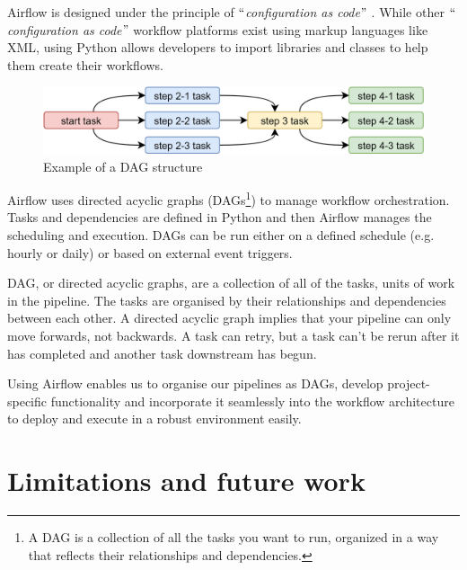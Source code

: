 Airflow is designed under the principle of $``$\textit{configuration as code}$"$ . While other $``$\textit{configuration as code}$"$  workflow platforms exist using markup languages like XML, using Python allows developers to import libraries and classes to help them create their workflows.

\begin{Center}
\begin{figure}[H]
	\begin{Center}
		\includegraphics[width=\textwidth]{images/image2.png}
		\caption{Example of a DAG structure}
		\label{fig:Example_of_a_DAG_structure}
	\end{Center}
\end{figure}
\end{Center}

Airflow uses directed acyclic graphs (DAGs\footnote{ A DAG is a collection of all the tasks you want to run, organized in a way that reflects their relationships and dependencies. }) to manage workflow orchestration. Tasks and dependencies are defined in Python and then Airflow manages the scheduling and execution. DAGs can be run either on a defined schedule (e.g. hourly or daily) or based on external event triggers.

DAG, or directed acyclic graphs, are a collection of all of the tasks, units of work in the pipeline. The tasks are organised by their relationships and dependencies between each other. A directed acyclic graph implies that your pipeline can only move forwards, not backwards. A task can retry, but a task can’t be rerun after it has completed and another task downstream has begun.

Using Airflow enables us to organise our pipelines as DAGs, develop project-specific functionality and incorporate it seamlessly into the workflow architecture to deploy and execute in a robust environment easily.

\section{Limitations and future work}

